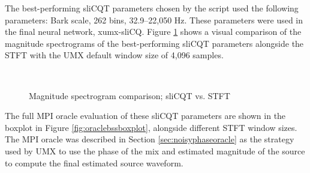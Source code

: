 \documentclass[report.tex]{subfiles}
\begin{document}
The best-performing sliCQT parameters chosen by the script used the following parameters: Bark scale, 262 bins, 32.9--22,050 Hz. These parameters were used in the final neural network, xumx-sliCQ. Figure \ref{fig:bipolarslicqs} shows a visual comparison of the magnitude spectrograms of the best-performing sliCQT parameters alongside the STFT with the UMX default window size of 4,096 samples.

\begin{figure}[ht]
	\centering
	\\
	\caption{Magnitude spectrogram comparison; sliCQT vs. STFT}
	\label{fig:bipolarslicqs}
\end{figure}

The full MPI oracle evaluation of these sliCQT parameters are shown in the boxplot in Figure \ref{fig:oraclebssboxplot}, alongside different STFT window sizes. The MPI oracle was described in Section \ref{sec:noisyphaseoracle} as the strategy used by UMX to use the phase of the mix and estimated magnitude of the source to compute the final estimated source waveform.
\end{document}
